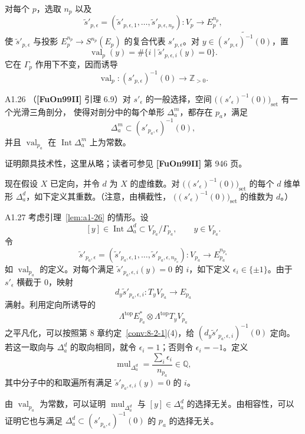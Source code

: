 对每个 $p$，选取 $n_p$ 以及
\[
 \widetilde s'_{p,\epsilon}
 =(\widetilde s'_{p,\epsilon,1},\ldots,
   \widetilde s'_{p,\epsilon,n_p})
 \colon V_p\longrightarrow E_p^{n_p},
\]
使 $\widetilde s'_{p,\epsilon}$ 与投影
$E_p^{n_p}\to S^{n_p}(E_p)$ 的复合代表 $s'_{p,\epsilon}$。对
$y\in\widetilde{(s'_{p,\epsilon})^{-1}(0)}$，置
\begin{equation}
 \operatorname{val}_p(y)
 =\#\{i\mid\widetilde s'_{p,\epsilon,i}(y)=0\}.
 \tag{A1.25}\label{eq:a1-25}
\end{equation}
它在 $\Gamma_p$ 作用下不变，因而诱导
\[
 \operatorname{val}_p\colon
 (s'_{p,\epsilon})^{-1}(0)\longrightarrow\mathbb Z_{>0}.
\]

\begin{lemma}{A1.26}\label{lem:a1-26}
（\textbf{[FuOn99II]} 引理 6.9）对 $s'_\epsilon$ 的一般选择，空间
$\bigl((s'_\epsilon)^{-1}(0)\bigr)_{\mathrm{set}}$ 有一个光滑三角剖分，
使得对剖分中的每个单形 $\Delta_a^m$，都存在 $p_a$，满足
\[
 \Delta_a^m\subset(s'_{p_a,\epsilon})^{-1}(0),
\]
并且 $\operatorname{val}_{p_a}$ 在 $\operatorname{Int}\Delta_a^m$ 上为常数。
\end{lemma}

证明颇具技术性，这里从略；读者可参见 \textbf{[FuOn99II]} 第 946 页。

现在假设 $X$ 已定向，并令 $d$ 为 $X$ 的虚维数。对
$\bigl((s'_\epsilon)^{-1}(0)\bigr)_{\mathrm{set}}$ 的每个 $d$ 维单形
$\Delta_a^d$，如下定义其重数。（注意，由横截性，
$\bigl((s'_\epsilon)^{-1}(0)\bigr)_{\mathrm{set}}$ 的维数为 $d$。）

\begin{definition}{A1.27}\label{def:a1-27}
考虑引理~\ref{lem:a1-26} 的情形。设
\[
 [y]\in\operatorname{Int}\Delta_a^d
 \subset V_{p_a}/\Gamma_{p_a},
 \qquad y\in V_{p_a}.
\]
令
\[
 \widetilde s'_{p_a,\epsilon}
 =(\widetilde s'_{p_a,\epsilon,1},\ldots,
   \widetilde s'_{p_a,\epsilon,n_{p_a}})
 \colon V_{p_a}\longrightarrow E_{p_a}^{n_{p_a}}
\]
如 $\operatorname{val}_{p_a}$ 的定义。对每个满足
$\widetilde s'_{p_a,\epsilon,i}(y)=0$ 的 $i$，如下定义
$\epsilon_i\in\{\pm1\}$。由于 $s'_\epsilon$ 横截于 $0$，映射
\[
 d_y\widetilde s'_{p_a,\epsilon,i}\colon
 T_yV_{p_a}\longrightarrow E_{p_a}
\]
满射。利用定向所诱导的
\[
 \Lambda^{\mathrm{top}}E_{p_a}^*
 \otimes\Lambda^{\mathrm{top}}T_yV_{p_a}
\]
之平凡化，可以按照第 8 章约定~\ref{conv:8-2-1}(4)，给
$(d_y\widetilde s'_{p_a,\epsilon,i})^{-1}(0)$ 定向。若这一取向与
$\Delta_a^d$ 的取向相同，就令 $\epsilon_i=1$；否则令
$\epsilon_i=-1$。定义
\[
 \operatorname{mul}_{\Delta_a^d}
 =\frac{\displaystyle\sum_i\epsilon_i}{n_{p_a}}
 \in\mathbb Q,
\]
其中分子中的和取遍所有满足
$\widetilde s'_{p_a,\epsilon,i}(y)=0$ 的 $i$。

由 $\operatorname{val}_{p_a}$ 为常数，可以证明
$\operatorname{mul}_{\Delta_a^d}$ 与
$[y]\in\Delta_a^d$ 的选择无关。由相容性，可以证明它也与满足
$\Delta_a^d\subset(s'_{p_a,\epsilon})^{-1}(0)$ 的 $p_a$ 的选择无关。
\end{definition}

